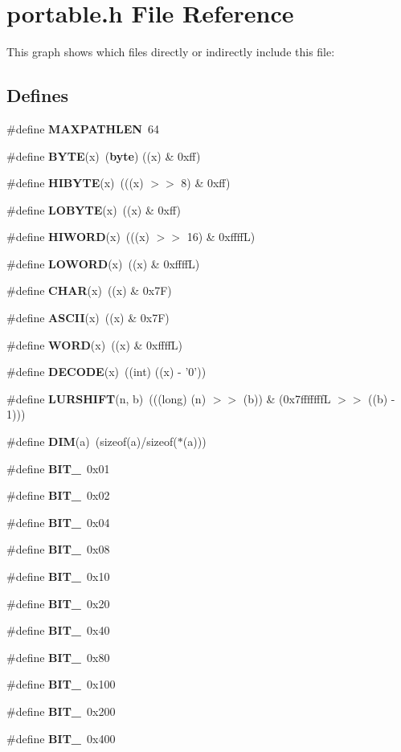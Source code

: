 \section{portable.h File Reference}
\label{portable_8h}


This graph shows which files directly or indirectly include this file:\subsection*{Defines}
\begin{CompactItemize}
\item 
\#define {\bf MAXPATHLEN}\ 64
\item 
\#define {\bf BYTE}(x)\ ({\bf byte}) ((x) \& 0xff)
\item 
\#define {\bf HIBYTE}(x)\ (((x) $>$$>$ 8) \& 0xff)
\item 
\#define {\bf LOBYTE}(x)\ ((x) \& 0xff)
\item 
\#define {\bf HIWORD}(x)\ (((x) $>$$>$ 16) \& 0xffff\-L)
\item 
\#define {\bf LOWORD}(x)\ ((x) \& 0xffff\-L)
\item 
\#define {\bf CHAR}(x)\ ((x) \& 0x7F)
\item 
\#define {\bf ASCII}(x)\ ((x) \& 0x7F)
\item 
\#define {\bf WORD}(x)\ ((x) \& 0xffff\-L)
\item 
\#define {\bf DECODE}(x)\ ((int) ((x) - '0'))
\item 
\#define {\bf LURSHIFT}(n, b)\ (((long) (n) $>$$>$ (b)) \& (0x7fffffff\-L $>$$>$ ((b) - 1)))
\item 
\#define {\bf DIM}(a)\ (sizeof(a)/sizeof($\ast$(a)))
\item 
\#define {\bf BIT\_}\ 0x01
\item 
\#define {\bf BIT\_}\ 0x02
\item 
\#define {\bf BIT\_}\ 0x04
\item 
\#define {\bf BIT\_}\ 0x08
\item 
\#define {\bf BIT\_}\ 0x10
\item 
\#define {\bf BIT\_}\ 0x20
\item 
\#define {\bf BIT\_}\ 0x40
\item 
\#define {\bf BIT\_}\ 0x80
\item 
\#define {\bf BIT\_}\ 0x100
\item 
\#define {\bf BIT\_}\ 0x200
\item 
\#define {\bf BIT\_}\ 0x400

\end{CompactItemize}
